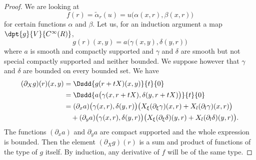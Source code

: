 \begin{proof}
	We are looking at
	\[
		f(r)=\tilde\alpha_r(u)=u\big( \alpha(x,r),\beta(x,r) \big)
	\]
	for certain functions $\alpha$ and $\beta$. Let us, for an induction argument a map $\dpt{ g }{ V }{  C^{\infty}(R) }$,
	\begin{equation} \label{eq_formfind}
		g(r)(x,y)=a\big( \gamma(x,y),\delta(y,r) \big)
	\end{equation}
	where $a$ is smooth and compactly supported and $\gamma$ and $\delta$ are smooth but not special compactly supported and neither bounded. We suppose however that $\gamma$ and $\delta$ are bounded on every bounded set. We have
	\begin{equation}
		\begin{split}
			(\partial_Xg)(r)(x,y)&=\Dsdd{ g(r+tX)(x,y) }{t}{0}\\
			&=\Dsdd{ a\big( \gamma(x,r+tX),\delta(y,r+tX) \big) }{t}{0}\\
			&=(\partial_xa)\big( \gamma(x,r),\delta(y,r) \big)
			\big( X_{\xi}(\partial_{\xi}\gamma)(x,r)+X_l(\partial_l\gamma)(x,r)   \big)\\
			&\quad+(\partial_ya)\big( \gamma(x,r),\delta(y,r) \big)\big( X_{\xi}(\partial_{\xi}\delta)(y,r)+X_l(\partial_l\delta)(y,r) \big).
		\end{split}
	\end{equation}
	The functions $(\partial_x a)$ and $\partial_ya$ are compact supported and the whole expression is bounded. Then the element $(\partial_Xg)(r)$ is a sum and product of functions of the type of $g$ itself. By induction, any derivative of $f$ will be of the same type.


\end{proof}
